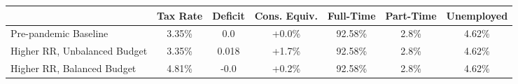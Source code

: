 \begin{center}
\begin{adjustbox}{width=\textwidth}
\begin{tabular}{lcccccc}\toprule
 & Tax Rate & Deficit & Cons. Equiv. & Full-Time & Part-Time & Unemployed \\
\midrule
Pre-pandemic Baseline & 3.35\% & 0.0 & +0.0\% & 92.58\% & 2.8\% & 4.62\% \\
Higher RR, Unbalanced Budget & 3.35\% & 0.018 & +1.7\% & 92.58\% & 2.8\% & 4.62\% \\
Higher RR, Balanced Budget & 4.81\% & -0.0 & +0.2\% & 92.58\% & 2.8\% & 4.62\% \\
\bottomrule\end{tabular}
\end{adjustbox}
\end{center}